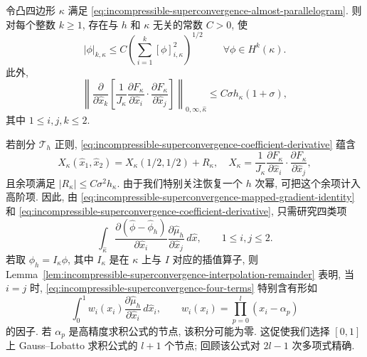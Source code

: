 \begin{Lemma}\label{lem:incompressible-superconvergence-map-bounds}
令凸四边形 $\kappa$ 满足
\eqref{eq:incompressible-superconvergence-almost-parallelogram}.
则对每个整数 $k\geq1$, 存在与 $h$ 和 $\kappa$ 无关的常数 $C>0$, 使
\begin{equation}\label{eq:incompressible-superconvergence-directional-bound}
|\phi|_{k,\kappa}
\leq C\left(\sum_{i=1}^k[\phi]_{i,\kappa}^2\right)^{1/2}
\qquad\forall\phi\in H^k(\kappa).
\end{equation}
此外,
\begin{equation}\label{eq:incompressible-superconvergence-coefficient-derivative}
\left\|
\frac{\partial}{\partial\widehat x_k}
\left[
\frac1{J_\kappa}
\frac{\partial F_\kappa}{\partial\widehat x_i}
\cdot\frac{\partial F_\kappa}{\partial\widehat x_j}
\right]\right\|_{0,\infty,\widehat\kappa}
\leq C\sigma h_\kappa(1+\sigma),
\end{equation}
其中 $1\leq i,j,k\leq2$.
\end{Lemma}

若剖分 $\mathcal T_h$ 正则,
\eqref{eq:incompressible-superconvergence-coefficient-derivative}
蕴含
\[
X_\kappa(\widehat x_1,\widehat x_2)
=X_\kappa(1/2,1/2)+R_\kappa,
\quad
X_\kappa=\frac1{J_\kappa}
\frac{\partial F_\kappa}{\partial\widehat x_i}
\cdot\frac{\partial F_\kappa}{\partial\widehat x_j},
\]
且余项满足 $|R_\kappa|\leq C\sigma^2h_\kappa$.
由于我们特别关注恢复一个 $h$ 次幂, 可把这个余项计入高阶项.
因此, 由
\eqref{eq:incompressible-superconvergence-mapped-gradient-identity}
和 \eqref{eq:incompressible-superconvergence-coefficient-derivative},
只需研究四类项
\begin{equation}\label{eq:incompressible-superconvergence-four-terms}
\int_{\widehat\kappa}
\frac{\partial(\widehat\phi-\widehat\phi_h)}
{\partial\widehat x_i}
\frac{\partial\widehat\mu_h}{\partial\widehat x_j}
\,d\widehat x,
\qquad1\leq i,j\leq2.
\end{equation}
若取 $\phi_h=I_\kappa\phi$, 其中 $I_\kappa$
是在 $\kappa$ 上与 $I$ 对应的插值算子,
则 Lemma~\ref{lem:incompressible-superconvergence-interpolation-remainder}
表明, 当 $i=j$ 时,
\eqref{eq:incompressible-superconvergence-four-terms}
特别含有形如
\[
\int_0^1w_i(x_i)
\frac{\partial\widehat\mu_h}{\partial\widehat x_i}
\,d\widehat x_i,
\qquad
w_i(x_i)=\prod_{p=0}^l(x_i-\alpha_p)
\]
的因子. 若 $\alpha_p$ 是高精度求积公式的节点,
该积分可能为零. 这促使我们选择 $[0,1]$
上 Gauss--Lobatto 求积公式的 $l+1$ 个节点;
回顾该公式对 $2l-1$ 次多项式精确.

